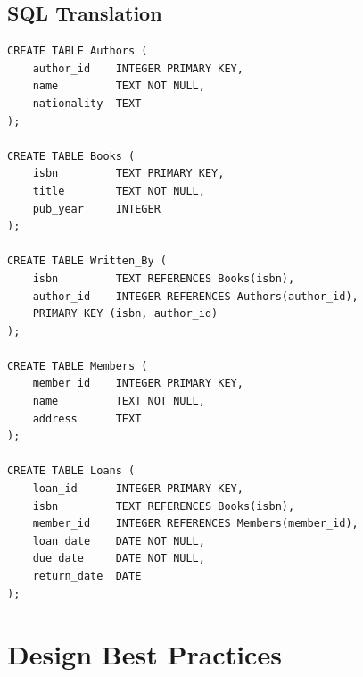 \begin{center}
\end{center}

\subsection{SQL Translation}

\begin{codeblock}[title=\textbf{Library Relational Schema}]
\begin{verbatim}
CREATE TABLE Authors (
    author_id    INTEGER PRIMARY KEY,
    name         TEXT NOT NULL,
    nationality  TEXT
);

CREATE TABLE Books (
    isbn         TEXT PRIMARY KEY,
    title        TEXT NOT NULL,
    pub_year     INTEGER
);

CREATE TABLE Written_By (
    isbn         TEXT REFERENCES Books(isbn),
    author_id    INTEGER REFERENCES Authors(author_id),
    PRIMARY KEY (isbn, author_id)
);

CREATE TABLE Members (
    member_id    INTEGER PRIMARY KEY,
    name         TEXT NOT NULL,
    address      TEXT
);

CREATE TABLE Loans (
    loan_id      INTEGER PRIMARY KEY,
    isbn         TEXT REFERENCES Books(isbn),
    member_id    INTEGER REFERENCES Members(member_id),
    loan_date    DATE NOT NULL,
    due_date     DATE NOT NULL,
    return_date  DATE
);
\end{verbatim}
\end{codeblock}

\section{Design Best Practices}

